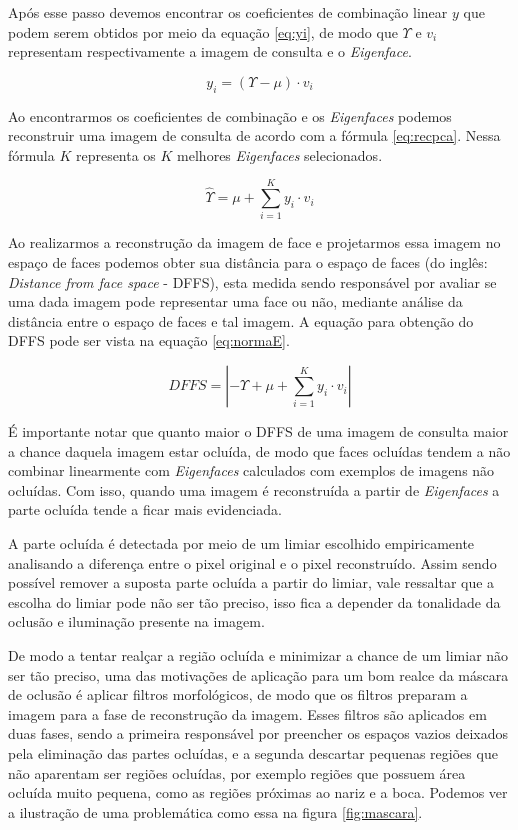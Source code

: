 Após esse passo devemos encontrar os coeficientes de combinação linear $y$ que podem serem obtidos por meio da equação \ref{eq:yi}, de modo que $\Upsilon$ e $v_i$ representam respectivamente a imagem de consulta e o \textit{Eigenface}.

\begin{equation}
y_i = (\Upsilon - \mu) \cdot v_i
\label{eq:yi}
\end{equation}

Ao encontrarmos os coeficientes de combinação e os \textit{Eigenfaces} podemos reconstruir uma imagem de consulta de acordo com a fórmula \ref{eq:recpca}. Nessa fórmula $K$ representa os $K$ melhores \textit{Eigenfaces} selecionados.

\begin{equation}
\hat{\Upsilon} = \mu + \sum_{i=1}^{K}y_i \cdot v_i 
\label{eq:recpca}
\end{equation}


 Ao realizarmos a reconstrução da imagem de face e projetarmos essa imagem no espaço de faces podemos obter sua distância para o espaço de faces (do inglês: \textit{Distance from face space} - DFFS), esta medida sendo responsável por avaliar se uma dada imagem pode representar uma face ou não, mediante análise da distância entre o espaço de faces e tal imagem. A equação para obtenção do DFFS pode ser vista na equação \ref{eq:normaE}.


\begin{equation}
DFFS = \left| -\Upsilon + \mu + \sum_{i=1}^{K}y_i \cdot v_i \right|
\label{eq:normaE}
\end{equation}

É importante notar que quanto maior o DFFS de uma imagem de consulta maior a chance daquela imagem estar ocluída, de modo que faces ocluídas tendem a não combinar linearmente com \textit{Eigenfaces} calculados com exemplos de imagens não ocluídas. Com isso, quando uma imagem é reconstruída a partir de \textit{Eigenfaces} a parte ocluída tende a ficar mais evidenciada. 

A parte ocluída é detectada por meio de um limiar escolhido empiricamente analisando a diferença entre o pixel original e o pixel reconstruído. Assim sendo possível remover a suposta parte ocluída a partir do limiar, vale ressaltar que a escolha do limiar pode não ser tão preciso, isso fica a depender da tonalidade da oclusão e iluminação presente na imagem. 

De modo a tentar realçar a região ocluída e minimizar a chance de um limiar não ser tão preciso, uma das motivações de aplicação para um bom realce da máscara de oclusão é aplicar filtros morfológicos, de modo que os filtros preparam a imagem para a fase de reconstrução da imagem. Esses filtros são aplicados em duas fases, sendo a primeira responsável por preencher os espaços vazios deixados pela eliminação das partes ocluídas, e a segunda descartar pequenas regiões que não aparentam ser regiões ocluídas, por exemplo regiões que possuem área ocluída muito pequena, como as regiões próximas ao nariz e a boca. Podemos ver a ilustração de uma problemática como essa na figura \ref{fig:mascara}.


